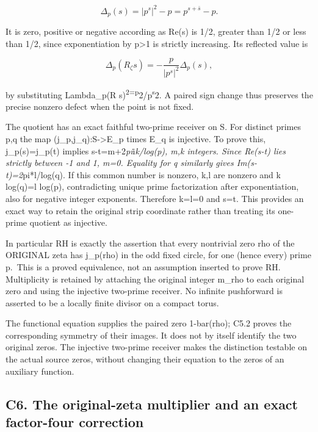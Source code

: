 \documentclass[
]{article}
\begin{document}
\[
\Delta_p(s)=|p^s|^2-p=p^{s+\bar s}-p.
\tag{C5.3}
\]

It is zero, positive or negative according as Re(s) is 1/2, greater than
1/2 or less than 1/2, since exponentiation by p\textgreater1 is strictly
increasing. Its reflected value is

\[
\Delta_p(R_\zeta s)=-\frac p{|p^s|^2}\Delta_p(s),
\tag{C5.4}
\]

by substituting \textbar Lambda\_p(R
s)\textbar{}\textsuperscript{2=p}2/\textbar p\textsuperscript{s\textbar{}}2.
A paired sign change thus preserves the precise nonzero defect when the
point is not fixed.

The quotient has an exact faithful two-prime receiver on S. For distinct
primes p,q the map (j\_p,j\_q):S-\textgreater E\_p times E\_q is
injective. To prove this, j\_p(s)=j\_p(t) implies
s-t=m+2\emph{pi}i\emph{k/log(p), m,k integers. Since Re(s-t) lies
strictly between -1 and 1, m=0. Equality for q similarly gives
Im(s-t)=2}pi*l/log(q). If this common number is nonzero, k,l are nonzero
and k log(q)=l log(p), contradicting unique prime factorization after
exponentiation, also for negative integer exponents. Therefore k=l=0 and
s=t. This provides an exact way to retain the original strip coordinate
rather than treating its one-prime quotient as injective.

In particular RH is exactly the assertion that every nontrivial zero rho
of the ORIGINAL zeta has j\_p(rho) in the odd fixed circle, for one
(hence every) prime p.~This is a proved equivalence, not an assumption
inserted to prove RH. Multiplicity is retained by attaching the original
integer m\_rho to each original zero and using the injective two-prime
receiver. No infinite pushforward is asserted to be a locally finite
divisor on a compact torus.

The functional equation supplies the paired zero 1-bar(rho); C5.2 proves
the corresponding symmetry of their images. It does not by itself
identify the two original zeros. The injective two-prime receiver makes
the distinction testable on the actual source zeros, without changing
their equation to the zeros of an auxiliary function.

\subsection{C6. The original-zeta multiplier and an exact factor-four
correction}\label{c6.-the-original-zeta-multiplier-and-an-exact-factor-four-correction}
\end{document}
